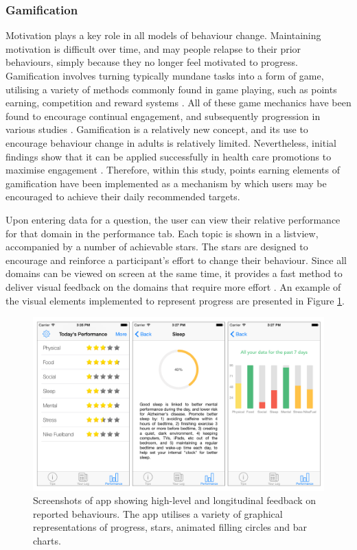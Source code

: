 \subsubsection{Gamification}
Motivation plays a key role in all models of behaviour change. Maintaining motivation is difficult over time, and may people relapse to their prior behaviours, simply because they no longer feel motivated to progress. Gamification involves turning typically mundane tasks into a form of game, utilising a variety of methods commonly found in game playing, such as points earning, competition and reward systems \cite{Deterding2011a}. All of these game mechanics have been found to encourage continual engagement, and subsequently progression in various studies \cite{Hamari2014}. Gamification is a relatively new concept, and its use to encourage behaviour change in adults is relatively limited. Nevertheless, initial findings show that it can be applied successfully in health care promotions to maximise engagement \cite{Schoech2013}. Therefore, within this study, points earning elements of gamification have been implemented as a mechanism by which users may be encouraged to achieve their daily recommended targets.

Upon entering data for a question, the user can view their relative performance for that domain in the performance tab. Each topic is shown in a listview, accompanied by a number of achievable stars. The stars are designed to encourage and reinforce a participant’s effort to change their behaviour. Since all domains can be viewed on screen at the same time, it provides a fast method to deliver visual feedback on the domains that require more effort \cite{Hartin2015-JMIR}. An example of the visual elements implemented to represent progress are presented in Figure \ref{fig: screenshot-performance}.
\begin{figure}[h]
    \centering
    \includegraphics[scale=0.2, angle=0]{Files/prevention-study-1/figures/screenshot-feedback.png}
    \caption{Screenshots of app showing high-level and longitudinal feedback on reported behaviours. The app utilises a variety of graphical representations of progress, stars, animated filling circles and bar charts.}
    \label{fig: screenshot-performance}
\end{figure}

